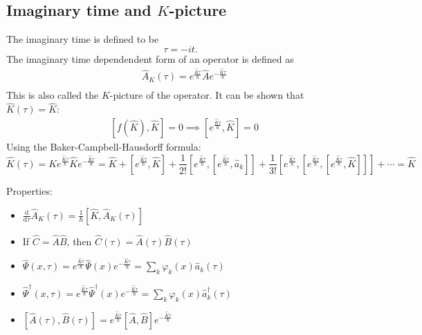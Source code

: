 \documentclass[11pt, a4paper]{article}
\newcommand{\dd}{\mathrm{d}}
\begin{document}
\subsection{Imaginary time and $K$-picture}
The imaginary time is defined to be
\begin{equation*}
    \tau = -it.
\end{equation*}
The imaginary time dependendent form of an operator is defined as 
\begin{align*}
    &\hat A_K(\tau) = e^{\frac{\hat K\tau}{\hbar}}\hat Ae^{-\frac{\hat K\tau}{\hbar}} \\
\end{align*}
This is also called the $K$-picture of the operator. It can be shown that $\hat K(\tau) = \hat K$:
\begin{align*}
    & \left[f(\hat K), \hat K \right] = 0 \implies \left[e^{\frac{\hat K\tau}{\hbar}}, \hat K\right] = 0
\end{align*}
Using the Baker-Campbell-Hausdorff formula:
\begin{equation*}
    \hat K(\tau) = Ke^{\frac{\hat K\tau}{\hbar}}\hat K e^{-\frac{\hat K\tau}{\hbar}} = \hat K + [e^{\frac{\hat K\tau}{\hbar}}, \hat K] 
    + \frac{1}{2!}[e^{\frac{\hat K\tau}{\hbar}}, [e^{\frac{\hat K\tau}{\hbar}},\hat a_k]]
    + \frac{1}{3!}[e^{\frac{\hat K\tau}{\hbar}}, [e^{\frac{\hat K\tau}{\hbar}}, [e^{\frac{\hat K\tau}{\hbar}},\hat K]]]
    + \cdots = \hat K
\end{equation*}

Properties:
\begin{itemize}
    \item $\displaystyle{\frac{\dd}{\dd\tau} \hat A_K(\tau) = \frac{1}{\hbar}[\hat K, \hat A_K(\tau)] }$
    \item If $\hat C = \hat A\hat B$, then $\hat C(\tau) = \hat A(\tau)\hat B(\tau)$
    \item $\displaystyle{\hat \Psi(x, \tau) = e^{\frac{\hat K\tau}{\hbar}}\hat\Psi(x)e^{-\frac{\hat K\tau}{\hbar}} = \sum\limits_k \varphi_k(x)\hat a_k(\tau)}$
    \item $\displaystyle{\hat \Psi^{\dagger}(x, \tau) = e^{\frac{\hat K\tau}{\hbar}}\hat\Psi^{\dagger}(x)e^{-\frac{\hat K\tau}{\hbar}} = \sum\limits_k \varphi_k(x)\hat a_k^{\dagger}(\tau)}$
    \item $[\hat A(\tau), \hat B(\tau)] = e^{\frac{\hat K\tau}{\hbar}}[\hat A, \hat B]e^{-\frac{\hat K\tau}{\hbar}}$
\end{itemize}
\end{document}
